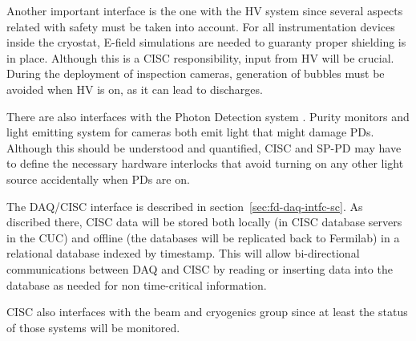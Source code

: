 Another important interface is the one with the HV system \cite{bib:docdb6787} since several aspects related with safety must be taken into account. 
For all instrumentation devices inside the cryostat, E-field simulations are needed to guaranty proper shielding is in place.
Although this is a CISC responsibility, input from HV will be crucial.
During the deployment of inspection cameras, generation of bubbles must be avoided when HV is on, as it can lead to discharges.

There are also interfaces with the Photon Detection system \cite{bib:docdb6730}. Purity monitors and light emitting system for cameras both emit light that might damage PDs.
Although this should be understood and quantified, CISC and SP-PD may have to define the necessary hardware interlocks
that avoid turning on any other light source accidentally when PDs are on.

The DAQ/CISC interface \cite{bib:docdb6790} is described in section~\ref{sec:fd-daq-intfc-sc}. As discribed there, 
CISC data will be stored both locally (in CISC database servers in the
CUC) and offline (the databases will be replicated back to Fermilab)
in a relational database indexed by timestamp.
This will allow bi-directional communications between DAQ and CISC by
reading or inserting data into the database as needed for non
time-critical information.  





CISC also interfaces with the beam and cryogenics group since at least the status of those systems will be monitored.

